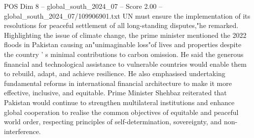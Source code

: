 \begin{textsample}{POS Dim 8 – global\_south\_2024\_07 – Score 2.00 – global\_south\_2024\_07/109906901.txt}
UN must ensure the implementation of its resolutions for peaceful settlement of all long-standing disputes,"he remarked.
Highlighting the issue of climate change, the prime minister mentioned the 2022 floods in Pakistan causing an"unimaginable loss"of lives and properties despite the country ' s minimal contributions to carbon omission.
He said the generous financial and technological assistance to vulnerable countries would enable them to rebuild, adapt, and achieve resilience.
He also emphasised undertaking fundamental reforms in international financial architecture to make it more effective, inclusive, and equitable.
Prime Minister Shehbaz reiterated that Pakistan would continue to strengthen multilateral institutions and enhance global cooperation to realise the common objectives of equitable and peaceful world order, respecting principles of self-determination, sovereignty, and non-interference.

\end{textsample}
